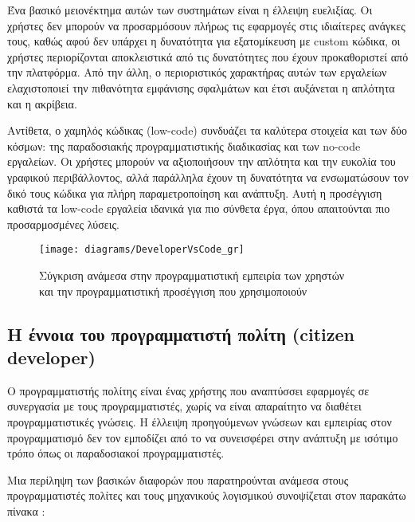                 Ένα βασικό μειονέκτημα αυτών των συστημάτων είναι η έλλειψη ευελιξίας. Οι χρήστες δεν μπορούν να προσαρμόσουν πλήρως τις εφαρμογές στις ιδιαίτερες ανάγκες τους, καθώς αφού δεν υπάρχει η δυνατότητα για εξατομίκευση με custom κώδικα, οι χρήστες περιορίζονται αποκλειστικά από τις δυνατότητες που έχουν προκαθοριστεί από την πλατφόρμα. Από την άλλη, ο περιοριστικός χαρακτήρας αυτών των εργαλείων ελαχιστοποιεί την πιθανότητα εμφάνισης σφαλμάτων και έτσι αυξάνεται η απλότητα και η ακρίβεια.

                Αντίθετα, ο χαμηλός κώδικας (low-code) συνδυάζει τα καλύτερα στοιχεία και των δύο κόσμων: της παραδοσιακής προγραμματιστικής διαδικασίας και των no-code εργαλείων. Οι χρήστες μπορούν να αξιοποιήσουν την απλότητα και την ευκολία του γραφικού περιβάλλοντος, αλλά παράλληλα έχουν τη δυνατότητα να ενσωματώσουν τον δικό τους κώδικα για πλήρη παραμετροποίηση και ανάπτυξη. Αυτή η προσέγγιση καθιστά τα low-code εργαλεία ιδανικά για πιο σύνθετα έργα, όπου απαιτούνται πιο προσαρμοσμένες λύσεις. \cite{LowCodeSimon}

            \begin{figure}[h!] \noindent \centering
                    \texttt{[image: diagrams/DeveloperVsCode\_gr]}
                    \caption{\centering Σύγκριση ανάμεσα στην προγραμματιστική εμπειρία των χρηστών \\ και την προγραμματιστική προσέγγιση που χρησιμοποιούν \cite{LowCodeSimon}}
            \end{figure}

            \subsection{Η έννοια του προγραμματιστή πολίτη (citizen developer)} \label{subsec:citizen-developer}
                Ο προγραμματιστής πολίτης είναι ένας χρήστης που αναπτύσσει εφαρμογές σε συνεργασία με τους προγραμματιστές, χωρίς να είναι απαραίτητο να διαθέτει προγραμματιστικές γνώσεις. Η έλλειψη προηγούμενων γνώσεων και εμπειρίας στον προγραμματισμό δεν τον εμποδίζει από το να συνεισφέρει στην ανάπτυξη με ισότιμο τρόπο όπως οι παραδοσιακοί προγραμματιστές.

                Μια περίληψη των βασικών διαφορών που παρατηρούνται ανάμεσα στους προγραμματιστές πολίτες και τους μηχανικούς λογισμικού συνοψίζεται στον παρακάτω πίνακα \cite{LowCodeSimon}:

